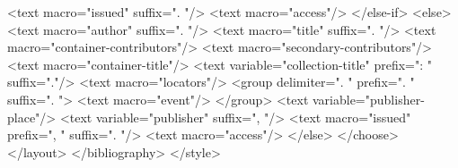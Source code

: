           <text macro="issued" suffix=". "/>
          <text macro="access"/>
        </else-if>
        <else>
          <text macro="author" suffix=". "/>
          <text macro="title" suffix=". "/>
          <text macro="container-contributors"/>
          <text macro="secondary-contributors"/>
          <text macro="container-title"/>
          <text variable="collection-title" prefix=": " suffix="."/>
          <text macro="locators"/>
          <group delimiter=". " prefix=". " suffix=". ">
            <text macro="event"/>
          </group>
          <text variable="publisher-place"/>
          <text variable="publisher" suffix=", "/>
          <text macro="issued" prefix=", " suffix=". "/>
          <text macro="access"/>
        </else>
      </choose>
    </layout>
  </bibliography>
</style>
